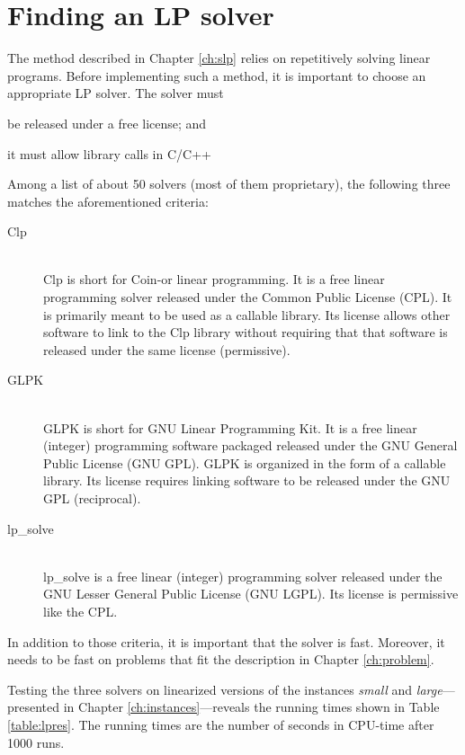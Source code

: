 \section{Finding an LP solver}
The method described in Chapter \ref{ch:slp} relies on repetitively solving
linear programs. Before implementing such a method, it is important to choose
an appropriate LP solver. The solver must
\begin{inparaenum}
\item be released under a free license; and
\item it must allow library calls in C/C++
\end{inparaenum}

Among a list of about 50 solvers (most of them proprietary), the
following three matches the aforementioned criteria:
\begin{description}
\item[Clp] \hfill \\
Clp is short for Coin-or linear programming. It is a free linear programming
solver released under the Common Public License (CPL). It is primarily meant to
be used as a callable library. Its license allows other software to link to the
Clp library without requiring that that software is released under the same
license (permissive). \cite{clp}
\item[GLPK] \hfill \\
GLPK is short for GNU Linear Programming Kit. It is a free linear (integer)
programming software packaged released under the GNU General Public License
(GNU GPL). GLPK is organized in the form of a callable library. Its license
requires linking software to be released under the GNU GPL (reciprocal).
\cite{glpk}
\item[lp\_solve] \hfill \\
lp\_solve is a free linear (integer) programming solver released under the GNU 
Lesser General Public License (GNU LGPL). Its license is permissive like the
CPL. \cite{lpsolve}
\end{description}

In addition to those criteria, it is important that the solver is fast.
Moreover, it needs to be fast on problems that fit the description in
Chapter \ref{ch:problem}.

Testing the three solvers on linearized versions of the instances
\textit{small} and \textit{large}---presented in
Chapter \ref{ch:instances}---reveals the running times shown in Table
\ref{table:lpres}.
The running times are the number of seconds in CPU-time after 1000 runs.

